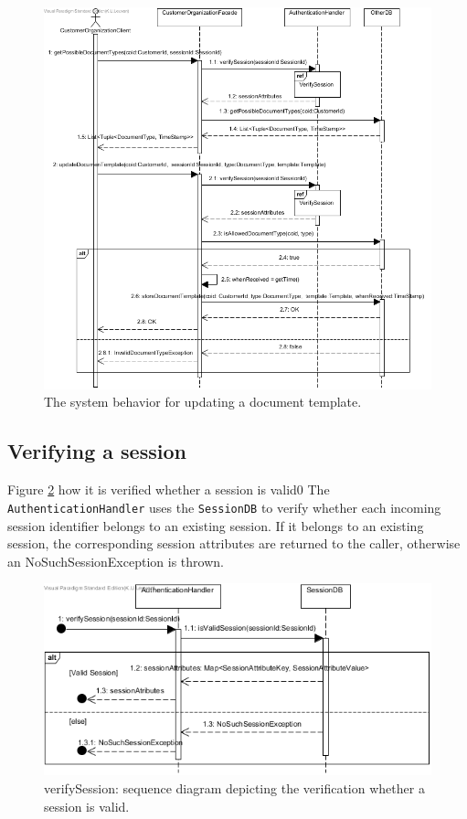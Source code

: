 \documentclass[a4paper,10pt]{article}
\begin{document}
\begin{figure}[!htp]
    \centering
    \includegraphics[width=\textwidth]{Seq_UC20UpdateDocumentTemplate.png}

    
    \caption{The system behavior for updating a document template.
        }\label{fig:seq_UC20UpdateDocumentTemplate}
\end{figure}

\subsection{Verifying a session}
Figure \ref{fig:seq_VerifySession} how it is verified whether a session is valid0 The \texttt{AuthenticationHandler} uses the \texttt{SessionDB} to verify whether each incoming session identifier belongs to an existing session. If it belongs to an existing session, the corresponding session attributes are returned to the caller, otherwise an NoSuchSessionException is thrown.
\begin{figure}[!htp]
    \centering
    \includegraphics[width=\textwidth]{Seq_VerifySession.png}
    \caption{verifySession: sequence diagram depicting the verification whether a session is valid.
        }\label{fig:seq_VerifySession}
\end{figure}
\end{document}
